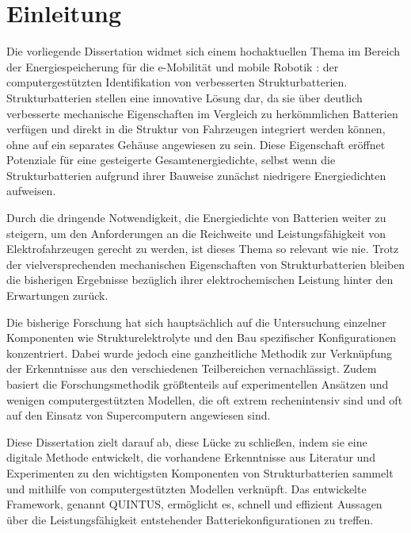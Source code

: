 \chapter[Einleitung]{\label{sec:Einleitung}Einleitung}

Die vorliegende Dissertation widmet sich einem hochaktuellen Thema im Bereich der Energiespeicherung für die e-Mobilität \cite{Huo2015, Donateo2015,Jochem2015,Kim2014,Orsi2016,Silva2011,Holdway2010,Sternberg2015,Ramachandran2015} und mobile Robotik \cite{Hecht2023,Mikolajczyk2023,Ghobadpour2023,Mikolajczyk2023a}: der computergestützten Identifikation von verbesserten Strukturbatterien. Strukturbatterien stellen eine innovative Lösung dar, da sie über deutlich verbesserte mechanische Eigenschaften im Vergleich zu herkömmlichen Batterien verfügen und direkt in die Struktur von Fahrzeugen integriert werden können, ohne auf ein separates Gehäuse angewiesen zu sein. Diese Eigenschaft eröffnet Potenziale für eine gesteigerte Gesamtenergiedichte, selbst wenn die Strukturbatterien aufgrund ihrer Bauweise zunächst niedrigere Energiedichten aufweisen.

Durch die dringende Notwendigkeit, die Energiedichte von Batterien weiter zu steigern, um den Anforderungen an die Reichweite und Leistungsfähigkeit von Elektrofahrzeugen gerecht zu werden, ist dieses Thema so relevant wie nie. Trotz der vielversprechenden mechanischen Eigenschaften von Strukturbatterien bleiben die bisherigen Ergebnisse bezüglich ihrer elektrochemischen Leistung hinter den Erwartungen zurück.

Die bisherige Forschung hat sich hauptsächlich auf die Untersuchung einzelner Komponenten wie Strukturelektrolyte und den Bau spezifischer Konfigurationen konzentriert. Dabei wurde jedoch eine ganzheitliche Methodik zur Verknüpfung der Erkenntnisse aus den verschiedenen Teilbereichen vernachlässigt. Zudem basiert die Forschungsmethodik größtenteils auf experimentellen Ansätzen und wenigen computergestützten Modellen, die oft extrem rechenintensiv sind und oft auf den Einsatz von Supercomputern angewiesen sind.

Diese Dissertation zielt darauf ab, diese Lücke zu schließen, indem sie eine digitale Methode entwickelt, die vorhandene Erkenntnisse aus Literatur und Experimenten zu den wichtigsten Komponenten von Strukturbatterien sammelt und mithilfe von computergestützten Modellen verknüpft. Das entwickelte Framework, genannt QUINTUS, ermöglicht es, schnell und effizient Aussagen über die Leistungsfähigkeit entstehender Batteriekonfigurationen zu treffen.

